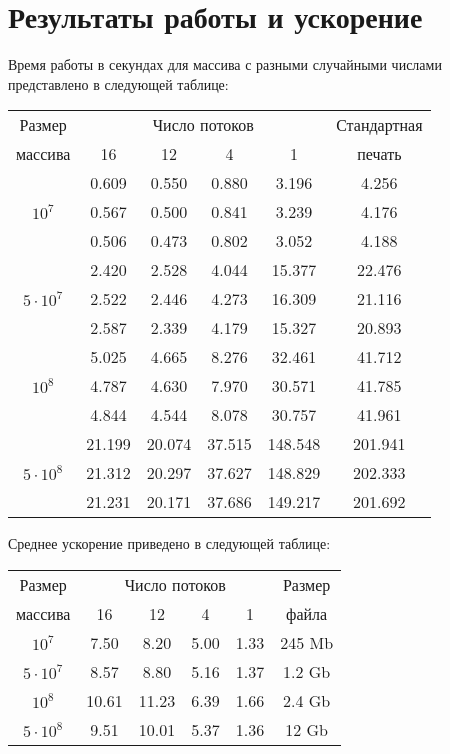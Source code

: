 \documentclass[a4paper, 12pt, twoside]{article}
\begin{document}
\section{Результаты работы и ускорение}
Время работы в секундах для массива с разными случайными числами представлено в следующей таблице:
\begin{center}
\begin{tabular}{||c|c|c|c|c|c||}
\hline
\hline
Размер & \multicolumn{4}{c|}{Число потоков} & Стандартная\\
\hhline{~|-|-|-|-|~|}
массива & 16 & 12 & 4 & 1 & печать \\
\hline
\hline
& 0.609 & 0.550 & 0.880 & 3.196 & 4.256 \\
\hhline{~|-|-|-|-|-|}
$10^7$ & 0.567 & 0.500 & 0.841 & 3.239 & 4.176 \\
\hhline{~|-|-|-|-|-|}
& 0.506 &0.473 & 0.802 & 3.052 & 4.188 \\
\hline
& 2.420 & 2.528 & 4.044 & 15.377 & 22.476 \\
\hhline{~|-|-|-|-|-|}
$5 \cdot 10^7$  & 2.522 & 2.446 & 4.273 & 16.309 & 21.116\\
\hhline{~|-|-|-|-|-|}
& 2.587 & 2.339 & 4.179 & 15.327 & 20.893 \\
\hline
& 5.025 & 4.665 & 8.276 & 32.461 & 41.712 \\
\hhline{~|-|-|-|-|-|}
$10^8$  & 4.787 & 4.630 & 7.970 & 30.571 & 41.785 \\
\hhline{~|-|-|-|-|-|}
& 4.844 & 4.544 & 8.078 & 30.757 & 41.961 \\\hline
& 21.199 & 20.074 & 37.515 & 148.548 & 201.941 \\
\hhline{~|-|-|-|-|-|}
$5 \cdot 10^8$  & 21.312 & 20.297 & 37.627 & 148.829 & 202.333 \\
\hhline{~|-|-|-|-|-|}
 & 21.231 & 20.171 & 37.686 & 149.217 & 201.692 \\
\hline
\hline
\end{tabular}
\end{center}
Среднее ускорение приведено в следующей таблице:
\begin{center}
\begin{tabular}{||c|c|c|c|c|c||}
\hline
\hline
Размер & \multicolumn{4}{c|}{Число потоков} & Размер\\
\hhline{~|-|-|-|-|~|}
массива & 16 & 12 & 4 & 1 & файла \\
\hline
$10^7$ & 7.50 & 8.20 & 5.00 & 1.33 & 245 Mb \\
\hline
$5 \cdot 10^7$ & 8.57 & 8.80 & 5.16 & 1.37 & 1.2 Gb \\
\hline
$10^8$ & 10.61 & 11.23 & 6.39 & 1.66 & 2.4 Gb\\
\hline
$5 \cdot 10^8$ & 9.51 & 10.01 & 5.37 & 1.36 & 12 Gb \\
\hline
\hline
\end{tabular}
\end{center}
\end{document}
